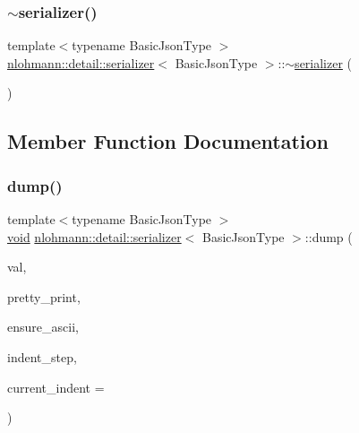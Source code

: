\subsubsection{\texorpdfstring{$\sim$serializer()}{~serializer()}}
{\footnotesize\ttfamily template$<$typename Basic\+Json\+Type $>$ \\
\mbox{\hyperlink{classnlohmann_1_1detail_1_1serializer}{nlohmann\+::detail\+::serializer}}$<$ Basic\+Json\+Type $>$\+::$\sim$\mbox{\hyperlink{classnlohmann_1_1detail_1_1serializer}{serializer}} (\begin{DoxyParamCaption}{ }\end{DoxyParamCaption})\hspace{0.3cm}{\ttfamily [default]}}



\subsection{Member Function Documentation}
\mbox{\label{classnlohmann_1_1detail_1_1serializer_a95460ebd1a535a543e5a0ec52e00f48b}} 
\subsubsection{\texorpdfstring{dump()}{dump()}}
{\footnotesize\ttfamily template$<$typename Basic\+Json\+Type $>$ \\
\mbox{\hyperlink{namespacenlohmann_1_1detail_a59fca69799f6b9e366710cb9043aa77d}{void}} \mbox{\hyperlink{classnlohmann_1_1detail_1_1serializer}{nlohmann\+::detail\+::serializer}}$<$ Basic\+Json\+Type $>$\+::dump (\begin{DoxyParamCaption}\item[{const Basic\+Json\+Type \&}]{val,  }\item[{const bool}]{pretty\+\_\+print,  }\item[{const bool}]{ensure\+\_\+ascii,  }\item[{const unsigned int}]{indent\+\_\+step,  }\item[{const unsigned int}]{current\+\_\+indent = {} }\end{DoxyParamCaption})\hspace{0.3cm}{\ttfamily [inline]}}



